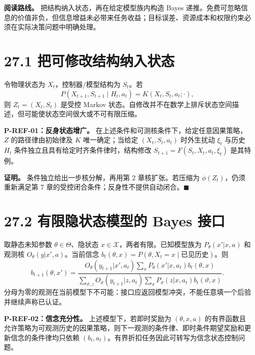 \documentclass[
  11pt,
  oneside]{book}
\begin{document}
\textbf{阅读路线。} 把结构纳入状态，再在给定模型族内构造 Bayes 递推。免费可忽略信息的价值非负，但信息增益未必带来任务收益；目标误差、资源成本和权限约束必须在实际决策问题中明确处理。

\section{27.1 把可修改结构纳入状态}\label{ux628aux53efux4feeux6539ux7ed3ux6784ux7eb3ux5165ux72b6ux6001}

令物理状态为 \(X_t\)，控制器/模型结构为 \(S_t\)。若 \[P(X_{t+1},S_{t+1}\mid H_t,a_t)
=K(X_t,S_t,a_t;\cdot),\] 则 \(Z_t=(X_t,S_t)\) 是受控 Markov 状态。自修改并不在数学上排斥状态空间描述，但可能使状态空间很大或不可有限压缩。

\hypertarget{p-ref-01}{}\label{p-ref-01}

\textbf{P-REF-01：反身状态增广。} 在上述条件和可测核条件下，给定任意因果策略，\(Z\) 的路径律由初始律及 \(K\) 唯一确定；当给定 \((X_t,S_t,a_t)\) 时外生扰动 \(\xi_t\) 与历史 \(H_t\) 条件独立且具有给定时齐条件律时，结构修改 \(S_{t+1}=F(S_t,X_t,a_t,\xi_t)\) 是其特例。

\textbf{证明。} 条件独立给出一步核分解，再用第 2 章核扩张。若压缩为 \(\phi(Z_t)\)，仍须重新满足第 7 章的受控闭合条件；反身性不提供自动闭合。\(\blacksquare\)

\section{27.2 有限隐状态模型的 Bayes 接口}\label{ux6709ux9650ux9690ux72b6ux6001ux6a21ux578bux7684-bayes-ux63a5ux53e3}

取静态未知参数 \(\theta\in\Theta\)、隐状态 \(x\in\mathcal X\)，两者有限。已知模型族为 \(P_\theta(x'|x,a)\) 和观测核 \(O_\theta(y|x',a)\)。当前信念 \(b_t(\theta,x)=P(\theta,X_t=x\mid\text{已见历史})\)。则 \[b_{t+1}(\theta,x')=
\frac{O_\theta(y_{t+1}|x',a_t)
\sum_xP_\theta(x'|x,a_t)b_t(\theta,x)}
{\sum_{\vartheta,z}O_\vartheta(y_{t+1}|z,a_t)
\sum_xP_\vartheta(z|x,a_t)b_t(\vartheta,x)}.\] 分母为零的观测在当前模型下不可能：接口应返回模型冲突，不能任意填一个后验并继续声称已认证。

\hypertarget{p-ref-02}{}\label{p-ref-02}

\textbf{P-REF-02：信念充分性。} 上述模型下，若即时奖励为 \((\theta,x,a)\) 的有界函数且允许策略为可观测历史的因果策略，则下一观测的条件律、即时条件期望奖励和更新信念的条件律均只依赖 \((b_t,a_t)\)。有界折扣任务因此可转写为信念状态控制问题。
\end{document}
